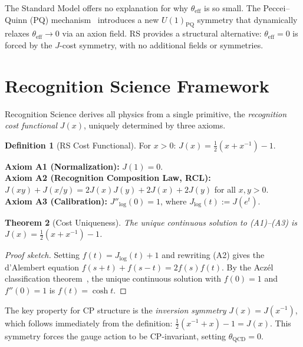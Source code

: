\documentclass[12pt,a4paper]{article}
\newtheorem{theorem}{Theorem}[section]
\theoremstyle{definition}
\newtheorem{definition}[theorem]{Definition}
\theoremstyle{remark}
\begin{document}
The Standard Model offers no explanation for why
$\theta_{\mathrm{eff}}$ is so small.  The Peccei--Quinn (PQ)
mechanism~\cite{PQ} introduces a new $U(1)_{\mathrm{PQ}}$
symmetry that dynamically relaxes $\theta_{\mathrm{eff}} \to 0$
via an axion field.  RS provides a structural alternative:
$\theta_{\mathrm{eff}} = 0$ is forced by the
$J$-cost symmetry, with no additional fields or symmetries.

\section{Recognition Science Framework}
\label{sec:framework}

Recognition Science derives all physics from a single primitive,
the \emph{recognition cost functional} $J(x)$, uniquely determined
by three axioms.

\begin{definition}[RS Cost Functional]
For $x > 0$: $J(x) = \tfrac{1}{2}(x + x^{-1}) - 1$.
\end{definition}

\noindent\textbf{Axiom A1 (Normalization):} $J(1) = 0$.\\
\textbf{Axiom A2 (Recognition Composition Law, RCL):}
$J(xy) + J(x/y) = 2J(x)J(y) + 2J(x) + 2J(y)$ for all $x, y > 0$.\\
\textbf{Axiom A3 (Calibration):} $J''_{\log}(0) = 1$, where
$J_{\log}(t) := J(e^t)$.

\begin{theorem}[Cost Uniqueness]
\label{thm:unique}
The unique continuous solution to \textup{(A1)--(A3)} is
$J(x) = \tfrac{1}{2}(x + x^{-1}) - 1$.
\end{theorem}

\begin{proof}[Proof sketch]
Setting $f(t) = J_{\log}(t) + 1$ and rewriting \textup{(A2)} gives the
d'Alembert equation $f(s+t) + f(s-t) = 2f(s)f(t)$.  By the Acz\'el
classification theorem~\cite{Aczel1966}, the unique continuous solution
with $f(0) = 1$ and $f''(0) = 1$ is $f(t) = \cosh t$.
\end{proof}

\noindent The key property for CP structure is the \emph{inversion symmetry}
$J(x) = J(x^{-1})$, which follows immediately from the definition:
$\tfrac{1}{2}(x^{-1} + x) - 1 = J(x)$.  This symmetry forces the
gauge action to be CP-invariant, setting $\theta_{\mathrm{QCD}} = 0$.
\end{document}
